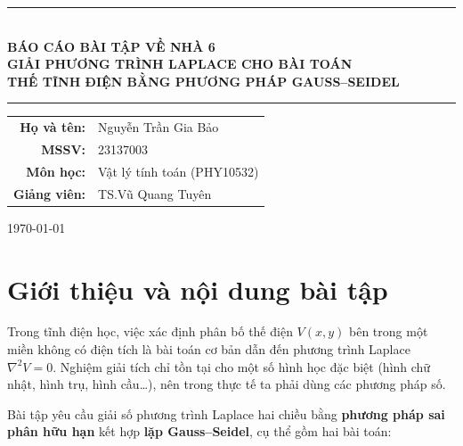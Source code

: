 \documentclass[12pt,a4paper]{article}
\begin{document}
\begin{titlepage}
    \centering
    \vspace*{2cm}

    \rule{\textwidth}{1pt} \\[0.5cm]
    {\huge \textbf{BÁO CÁO BÀI TẬP VỀ NHÀ 6}} \\[0.4cm]
    {\large \textbf{GIẢI PHƯƠNG TRÌNH LAPLACE CHO BÀI TOÁN}} \\[0.2cm]
    {\large \textbf{THẾ TĨNH ĐIỆN BẰNG PHƯƠNG PHÁP GAUSS--SEIDEL}} \\[0.2cm]
    \rule{\textwidth}{1pt}

    \vspace{2cm}

    {\large
    \begin{tabular}{rl}
        \textbf{Họ và tên:}  & Nguyễn Trần Gia Bảo \\[4pt]
        \textbf{MSSV:}       & 23137003 \\[4pt]
        \textbf{Môn học:}    & Vật lý tính toán (PHY10532) \\[4pt]
        \textbf{Giảng viên:} & TS.\@ Vũ Quang Tuyên \\
    \end{tabular}
    }

    \vfill
    {\large \today}
\end{titlepage}

\newpage
\tableofcontents
\newpage

\section{Giới thiệu và nội dung bài tập}

Trong tĩnh điện học, việc xác định phân bố thế điện $V(x,y)$ bên trong một miền không có điện tích là bài toán cơ bản dẫn đến phương trình Laplace $\nabla^2 V = 0$. Nghiệm giải tích chỉ tồn tại cho một số hình học đặc biệt (hình chữ nhật, hình trụ, hình cầu\ldots), nên trong thực tế ta phải dùng các phương pháp số.

Bài tập yêu cầu giải số phương trình Laplace hai chiều bằng \textbf{phương pháp sai phân hữu hạn} kết hợp \textbf{lặp Gauss--Seidel}, cụ thể gồm hai bài toán:
\end{document}
